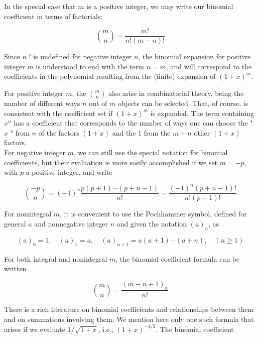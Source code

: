 \documentclass[10pt]{article}
\begin{document}
In the special case that $m$ is a positive integer, we may write our binomial coefficient in terms of factorials:


\begin{equation*}
\binom{m}{n}=\frac{m!}{n!(m-n)!} \tag{1.70}
\end{equation*}


Since $n$ ! is undefined for negative integer $n$, the binomial expansion for positive integer $m$ is understood to end with the term $n=m$, and will correspond to the coefficients in the polynomial resulting from the (finite) expansion of $(1+x)^{m}$.

For positive integer $m$, the $\binom{m}{n}$ also arise in combinatorial theory, being the number of different ways $n$ out of $m$ objects can be selected. That, of course, is consistent with the coefficient set if $(1+x)^{m}$ is expanded. The term containing $x^{n}$ has a coefficient that corresponds to the number of ways one can choose the " $x$ " from $n$ of the factors $(1+x)$ and the 1 from the $m-n$ other $(1+x)$ factors.\\
For negative integer $m$, we can still use the special notation for binomial coefficients, but their evaluation is more easily accomplished if we set $m=-p$, with $p$ a positive integer, and write


\begin{equation*}
\binom{-p}{n}=(-1)^{n} \frac{p(p+1) \cdots(p+n-1)}{n!}=\frac{(-1)^{n}(p+n-1)!}{n!(p-1)!} \tag{1.71}
\end{equation*}


For nonintegral $m$, it is convenient to use the Pochhammer symbol, defined for general $a$ and nonnegative integer $n$ and given the notation $(a)_{n}$, as


\begin{equation*}
(a)_{0}=1, \quad(a)_{1}=a, \quad(a)_{n+1}=a(a+1) \cdots(a+n), \quad(n \geq 1) \tag{1.72}
\end{equation*}


For both integral and nonintegral $m$, the binomial coefficient formula can be written


\begin{equation*}
\binom{m}{n}=\frac{(m-n+1)_{n}}{n!} \tag{1.73}
\end{equation*}


There is a rich literature on binomial coefficients and relationships between them and on summations involving them. We mention here only one such formula that arises if we evaluate $1 / \sqrt{1+x}$, i.e., $(1+x)^{-1 / 2}$. The binomial coefficient
\end{document}
